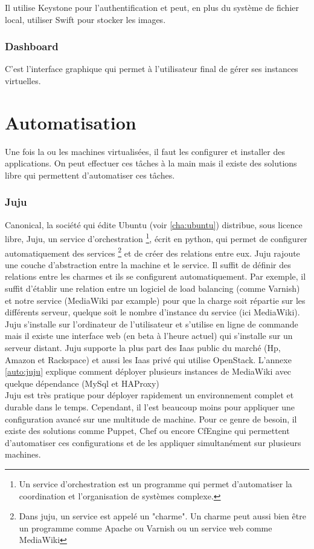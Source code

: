 \documentclass[a4paper,oneside]{report}
\begin{document}
Il utilise Keystone pour l'authentification et peut, en plus du système de fichier local, utiliser Swift pour stocker les images.

\subsubsection{Dashboard}
C'est l'interface graphique qui permet à l'utilisateur final de gérer ses instances virtuelles.

\section{Automatisation}

Une fois la ou les machines virtualisées, il faut les configurer et installer des applications. On peut effectuer ces tâches à la main mais il existe des solutions libre qui permettent d'automatiser ces tâches.

\subsubsection{Juju}
Canonical, la société qui édite Ubuntu (voir \ref{cha:ubuntu}) distribue, sous licence libre, Juju, un service d'orchestration
\footnote{Un service d'orchestration est un programme qui permet d'automatiser la coordination et l'organisation de systèmes complexe.}, 
écrit en python, qui permet de configurer automatiquement des services
\footnote{Dans juju, un service est appelé un "charme". Un charme peut aussi bien être un programme comme Apache ou Varnish ou un service web comme MediaWiki} 
et de créer des relations entre eux. 
Juju rajoute une couche d'abstraction entre la machine et le service. Il suffit de définir des relations entre les charmes et ils se configurent automatiquement. 
Par exemple, il suffit d'établir une relation entre un logiciel de load balancing (comme Varnish) et notre service (MediaWiki par example) pour que la charge soit répartie sur les différents serveur, quelque soit le nombre d'instance du service (ici MediaWiki).
Juju s'installe sur l'ordinateur de l'utilisateur et s'utilise en ligne de commande mais il existe une interface web (en beta à l'heure actuel) qui s'installe sur un serveur distant.
Juju supporte la plus part des Iaas public du marché (Hp, Amazon et Rackspace) et aussi les Iaas privé qui utilise OpenStack.
L'annexe \ref{auto:juju} explique comment déployer plusieurs instances de MediaWiki avec quelque dépendance (MySql et HAProxy)
\newline\\
Juju est très pratique pour déployer rapidement un environnement complet et durable dans le temps. 
Cependant, il l'est beaucoup moins pour appliquer une configuration avancé sur une multitude de machine.
Pour ce genre de besoin, il existe des solutions comme Puppet, Chef ou encore CfEngine qui permettent d'automatiser ces configurations et de les appliquer simultanément sur plusieurs machines.
\end{document}
